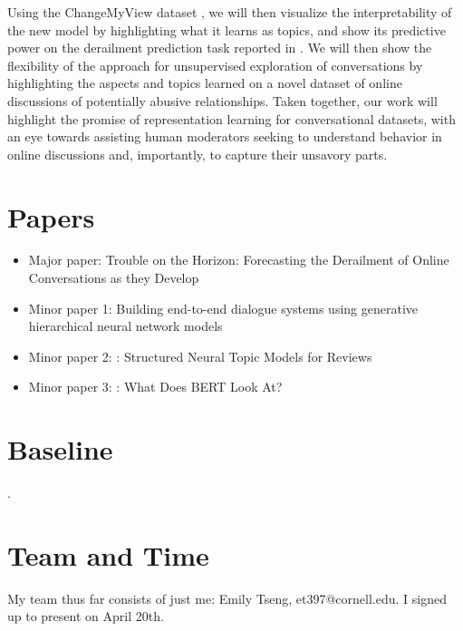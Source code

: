 \documentclass[11pt]{article}
\begin{document}
Using the ChangeMyView dataset \citep{convokit}, we will then visualize the interpretability of the new model by highlighting what it learns as topics, and show its predictive power on the derailment prediction task reported in \cite{Chang-Trouble:19}. We will then show the flexibility of the approach for unsupervised exploration of conversations by highlighting the aspects and topics learned on a novel dataset of online discussions of potentially abusive relationships. Taken together, our work will highlight the promise of representation learning for conversational datasets, with an eye towards assisting human moderators seeking to understand behavior in online discussions and, importantly, to capture their unsavory parts.

\section{Papers}

\begin{itemize}
    \item{Major paper:} \cite{Chang-Trouble:19} Trouble on the Horizon: Forecasting the Derailment of Online Conversations as they Develop
    \item{Minor paper 1:} \cite{serban2016building} Building end-to-end dialogue systems using generative hierarchical neural network models
    \item{Minor paper 2:} \cite{esmaeili19}: Structured Neural Topic Models for Reviews
    \item{Minor paper 3:} \cite{clark2019does}: What Does BERT Look At?
\end{itemize}

\section{Baseline}

\cite{Chang-Trouble:19}.

\section{Team and Time}

My team thus far consists of just me: Emily Tseng, et397@cornell.edu. I signed up to present on April 20th.




\end{document}
